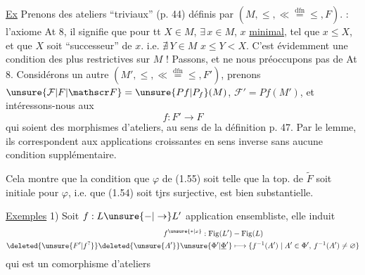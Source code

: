 \uline{Ex} Prenons des ateliers ``triviaux'' (p. 44) définis par $(M,\leq,\ll\overset{\mathrm{dfn}}{=}\leq,F)$.   : l'axiome At 8, il signifie que pour tt $X\in M$, $\exists\,x\in M$, $x$ \uline{minimal}, tel que $x\leq X$,  et que  $X$ soit ``successeur'' de
$x$. i.e. $\nexists\,Y\in M$  $x\leq Y<X$. C'est évidemment une condition des plus restrictives sur $M$ ! Passons, et ne nous préoccupons pas de At 8.
Considérons  un autre $(M',\leq,\ll\overset{\mathrm{dfn}}{=}\leq,F')$, prenons    $\unsure{\mathcal F|F|\mathscr F}=\unsure{Pf|P_f}(M)$, $\mathcal F'=Pf(M')$, et intéressons-nous aux
\[
f:F'\longrightarrow F
\]
 qui soient des morphismes d'ateliers, au sens de la définition p. 47. Par le lemme, ils correspondent aux  applications croissantes en sens inverse
sans aucune condition supplémentaire.

Cela montre que la condition que $\varphi$ de (1.55) soit telle que la top. de $\widetilde F$ soit  initiale pour $\varphi$, i.e. que (1.54) soit tjrs surjective, est bien substantielle.

\uline{Exemples} 1) Soit $f:L\unsure{-|\to}L'$ application ensembliste, elle induit 
\[
\begin{aligned}
f^{\unsure{*|x}}:\operatorname{Fig}(L')&-\operatorname{Fig}(L)\\
\deleted{\unsure{F'|f^{?}}}\deleted{\unsure{A'}}\unsure{\Phi'|\underline{\Phi}'}&\longmapsto\{f^{-1}(A')\mid A'\in\Phi',\, f^{-1}(A')\ne\varnothing\}
\end{aligned}
\]
qui est un comorphisme d'ateliers

